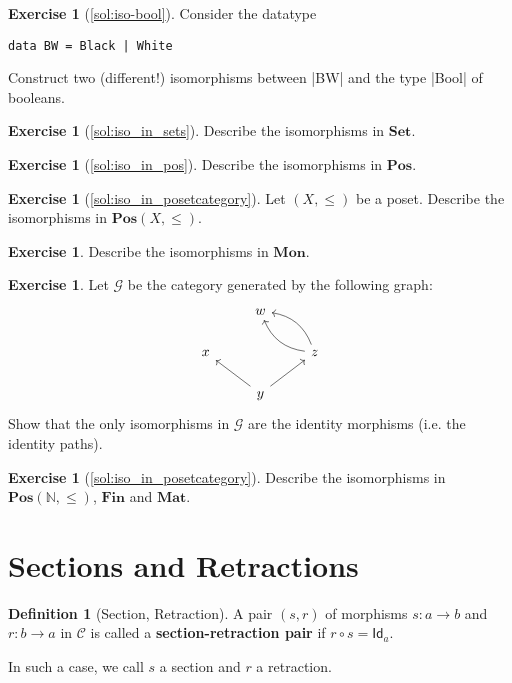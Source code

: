 \documentclass[a4paper,11pt, oneside,titlepage=false]{scrbook}
\theoremstyle{plain}
\theoremstyle{definition}
\newtheorem{dfn}[thm]{Definition}
\newtheorem{exer}[thm]{Exercise}
\newcommand{\cfont}[1]{\ensuremath{\mathsf{#1}}}
\newcommand{\Cat}[1]{\mathcal{#1}}
\newcommand{\CC}{\Cat{C}}
\newcommand{\Catb}[1]{\mathbf{#1}}
\newcommand{\SET}{\Catb{Set}}
\newcommand{\POS}{\Catb{Pos}}
\newcommand{\MON}{\Catb{Mon}}
\newcommand{\MAT}{\Catb{Mat}}
\newcommand{\SKELFINSET}{\Catb{Fin}}
\newcommand{\Id}[1][]{\cfont{Id}_{#1}}
\newcommand{\co}[2]{\ensuremath{#2 \circ #1}}
\newcommand{\NN}{\ensuremath{\mathbb{N}}}
\begin{document}
\begin{exer}[\cref{sol:iso-bool}]\label{exer:iso-bool}
  Consider the datatype
\begin{lstlisting}
data BW = Black | White
\end{lstlisting}
Construct two (different!) isomorphisms between |BW| and the type |Bool| of booleans.
\end{exer}

\begin{exer}[\cref{sol:iso_in_sets}]\label{exer:iso_in_sets}
  Describe the isomorphisms in $\SET$.
\end{exer}

\begin{exer}[\cref{sol:iso_in_pos}]\label{exer:iso_in_pos}
  Describe the isomorphisms in $\POS$.
\end{exer}

\begin{exer}[\cref{sol:iso_in_posetcategory}]\label{exer:iso_in_posetcategory}
  Let $(X,\leq)$ be a poset.
  Describe the isomorphisms in $\POS(X,\leq)$.
\end{exer}

\begin{exer}
  Describe the isomorphisms in $\MON$.
\end{exer}

\begin{exer} Let $\mathcal{G}$ be the category generated by the following graph:
\[
\begin{tikzcd}
& w & \\
x & & z \arrow[lu, bend left] \arrow[lu,bend right] \\
& y \arrow[lu] \arrow[ru] &
\end{tikzcd}
\]
Show that the only isomorphisms in $\mathcal{G}$ are the identity morphisms (i.e. the identity paths).
\end{exer}

\begin{exer}[\cref{sol:iso_in_posetcategory}] \label{exer:iso_in_cats_of_nats}
  Describe the isomorphisms in $\POS(\NN,\leq)$, $\SKELFINSET$ and $\MAT$.
\end{exer}

\section{Sections and Retractions}
\label{sec:sections}


\begin{dfn}[Section, Retraction]
  A pair $(s,r)$ of morphisms $s : a \to b$ and $r : b \to a$ in $\CC$ is called a \textbf{section-retraction pair} if $\co{s}{r} = \Id[a]$.

  In such a case, we call $s$ a section and $r$ a retraction.
\end{dfn}
\end{document}
